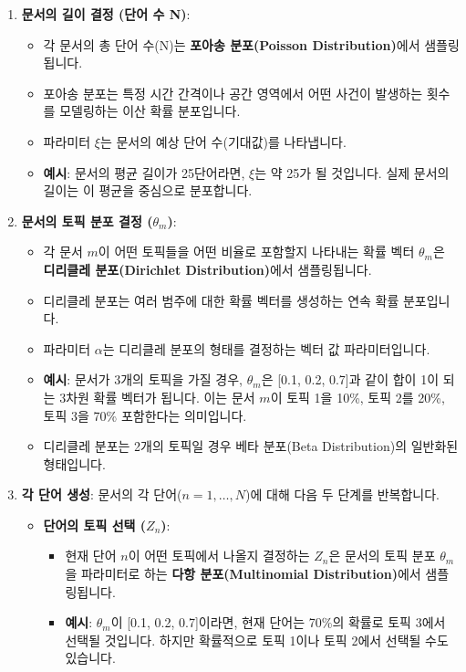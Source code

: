 \documentclass[11pt,a4paper]{article}
\theoremstyle{definition}
\begin{document}
\begin{enumerate}
    \item \textbf{문서의 길이 결정 (단어 수 N)}:
    \begin{itemize}
        \item 각 문서의 총 단어 수(N)는 \textbf{포아송 분포(Poisson Distribution)}에서 샘플링됩니다.
        \item 포아송 분포는 특정 시간 간격이나 공간 영역에서 어떤 사건이 발생하는 횟수를 모델링하는 이산 확률 분포입니다.
        \item 파라미터 $\xi$는 문서의 예상 단어 수(기대값)를 나타냅니다.
        \item \textbf{예시}: 문서의 평균 길이가 25단어라면, $\xi$는 약 25가 될 것입니다. 실제 문서의 길이는 이 평균을 중심으로 분포합니다.
    \end{itemize}
    \item \textbf{문서의 토픽 분포 결정 ($\theta_m$)}:
    \begin{itemize}
        \item 각 문서 $m$이 어떤 토픽들을 어떤 비율로 포함할지 나타내는 확률 벡터 $\theta_m$은 \textbf{디리클레 분포(Dirichlet Distribution)}에서 샘플링됩니다.
        \item 디리클레 분포는 여러 범주에 대한 확률 벡터를 생성하는 연속 확률 분포입니다.
        \item 파라미터 $\alpha$는 디리클레 분포의 형태를 결정하는 벡터 값 파라미터입니다.
        \item \textbf{예시}: 문서가 3개의 토픽을 가질 경우, $\theta_m$은 [0.1, 0.2, 0.7]과 같이 합이 1이 되는 3차원 확률 벡터가 됩니다. 이는 문서 $m$이 토픽 1을 10\%, 토픽 2를 20\%, 토픽 3을 70\% 포함한다는 의미입니다.
        \item 디리클레 분포는 2개의 토픽일 경우 베타 분포(Beta Distribution)의 일반화된 형태입니다.
    \end{itemize}
    \item \textbf{각 단어 생성}: 문서의 각 단어($n=1, \dots, N$)에 대해 다음 두 단계를 반복합니다.
    \begin{itemize}
        \item \textbf{단어의 토픽 선택 ($Z_n$)}:
        \begin{itemize}
            \item 현재 단어 $n$이 어떤 토픽에서 나올지 결정하는 $Z_n$은 문서의 토픽 분포 $\theta_m$을 파라미터로 하는 \textbf{다항 분포(Multinomial Distribution)}에서 샘플링됩니다.
            \item \textbf{예시}: $\theta_m$이 [0.1, 0.2, 0.7]이라면, 현재 단어는 70\%의 확률로 토픽 3에서 선택될 것입니다. 하지만 확률적으로 토픽 1이나 토픽 2에서 선택될 수도 있습니다.

\end{itemize}
\end{itemize}
\end{enumerate}
\end{document}

